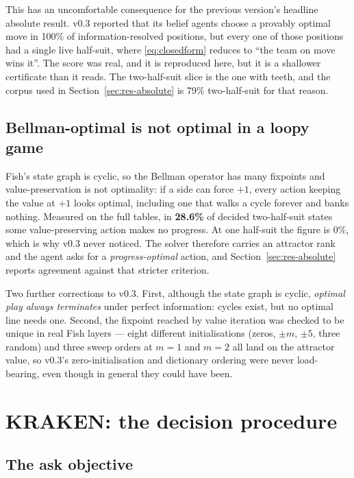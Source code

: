 \documentclass[11pt,letterpaper]{article}
\begin{document}
This has an uncomfortable consequence for the previous version's headline
absolute result. v0.3 reported that its belief agents choose a provably optimal
move in 100\% of information-resolved positions, but every one of those
positions had a single live half-suit, where \eqref{eq:closedform} reduces to
``the team on move wins it''. The score was real, and it is reproduced here, but
it is a shallower certificate than it reads. The two-half-suit slice is the one
with teeth, and the corpus used in Section~\ref{sec:res-absolute} is 79\%
two-half-suit for that reason.

\subsection{Bellman-optimal is not optimal in a loopy game}

Fish's state graph is cyclic, so the Bellman operator has many fixpoints and
value-preservation is not optimality: if a side can force $+1$, every action
keeping the value at $+1$ looks optimal, including one that walks a cycle
forever and banks nothing. Measured on the full tables, in \textbf{28.6\%} of
decided two-half-suit states some value-preserving action makes no progress. At
one half-suit the figure is $0\%$, which is why v0.3 never noticed. The solver
therefore carries an attractor rank and the agent asks for a
\emph{progress-optimal} action, and Section~\ref{sec:res-absolute} reports
agreement against that stricter criterion.

Two further corrections to v0.3. First, although the state graph is cyclic,
\emph{optimal play always terminates} under perfect information: cycles exist,
but no optimal line needs one. Second, the fixpoint reached by value iteration
was checked to be unique in real Fish layers --- eight different initialisations
(zeros, $\pm m$, $\pm 5$, three random) and three sweep orders at $m=1$ and
$m=2$ all land on the attractor value, so v0.3's zero-initialisation and
dictionary ordering were never load-bearing, even though in general they could
have been.

\section{KRAKEN: the decision procedure}

\subsection{The ask objective}
\label{sec:objective}
\end{document}
